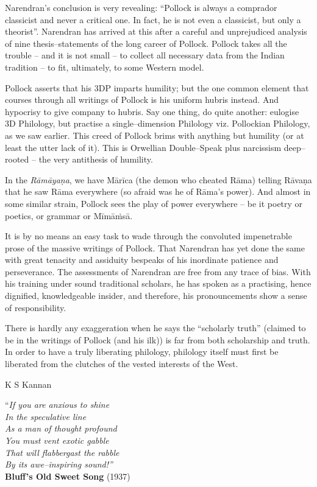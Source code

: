 Narendran’s conclusion is very revealing: “Pollock is always a comprador classicist and never a critical one. In fact, he is not even a classicist, but only a theorist”. Narendran has arrived at this after a careful and unprejudiced analysis of nine thesis–statements of the long career of Pollock. Pollock takes all the trouble – and it is not small – to collect all necessary data from the Indian tradition – to fit, ultimately, to some Western model.

Pollock asserts that his 3DP imparts humility; but the one common element that courses through all writings of Pollock is his uniform hubris instead. And hypocrisy to give company to hubris. Say one thing, do quite another: eulogise 3D Philology, but practise a single–dimension Philology viz. Pollockian Philology, as we saw earlier. This creed of Pollock brims with anything but humility (or at least the utter lack of it). This is Orwellian Double–Speak plus narcissism deep–rooted – the very antithesis of humility.

In the \textit{Rāmāyaṇa}, we have Mārīca (the demon who cheated Rāma) telling Rāvaṇa that he saw Rāma everywhere (so afraid was he of Rāma’s power). And almost in some similar strain, Pollock sees the play of power everywhere – be it poetry or poetics, or grammar or Mīmāṁsā.

It is by no means an easy task to wade through the convoluted impenetrable prose of the massive writings of Pollock. That Narendran has yet done the same with great tenacity and assiduity bespeaks of his inordinate patience and perseverance. The assessments of Narendran are free from any trace of bias. With his training under sound traditional scholars, he has spoken as a practising, hence dignified, knowledgeable insider, and therefore, his pronouncements show a sense of responsibility.

There is hardly any exaggeration when he says the “scholarly truth” (claimed to be in the writings of Pollock (and his ilk)) is far from both scholarship and truth. In order to have a truly liberating philology, philology itself must first be liberated from the clutches of the vested interests of the West.

K S Kannan

\delimiter

\begin{flushright}
“\textit{If you are anxious to shine\\ In the speculative line\\ As a man of thought profound\\ You must vent exotic gabble\\ That will flabbergast the rabble\\ By its awe–inspiring sound!”}\\\textbf{Bluff’s Old Sweet Song} (1937)
\end{flushright}

